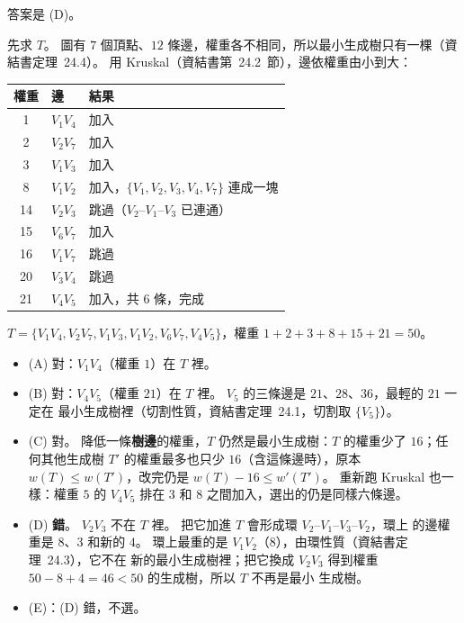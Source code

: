 \begin{pastsoln}
答案是 (D)。

先求 $T$。 圖有 $7$ 個頂點、$12$ 條邊，權重各不相同，所以最小生成樹只有一棵（資結書定理~24.4）。 用
Kruskal（資結書第~24.2~節），邊依權重由小到大：
\begin{center}
\begin{tabular}{cll}
\toprule
權重 & 邊 & 結果 \\
\midrule
1 & $V_1V_4$ & 加入 \\
2 & $V_2V_7$ & 加入 \\
3 & $V_1V_3$ & 加入 \\
8 & $V_1V_2$ & 加入，$\{V_1, V_2, V_3, V_4, V_7\}$ 連成一塊 \\
14 & $V_2V_3$ & 跳過（$V_2$--$V_1$--$V_3$ 已連通） \\
15 & $V_6V_7$ & 加入 \\
16 & $V_1V_7$ & 跳過 \\
20 & $V_3V_4$ & 跳過 \\
21 & $V_4V_5$ & 加入，共 $6$ 條，完成 \\
\bottomrule
\end{tabular}
\end{center}
$T = \{V_1V_4, V_2V_7, V_1V_3, V_1V_2, V_6V_7, V_4V_5\}$，權重 $1 + 2 + 3 + 8 + 15 + 21 = 50$。
\begin{itemize}
\item (A) 對：$V_1V_4$（權重 $1$）在 $T$ 裡。
\item (B) 對：$V_4V_5$（權重 $21$）在 $T$ 裡。 $V_5$ 的三條邊是 $21$、$28$、$36$，最輕的 $21$ 一定在
最小生成樹裡（切割性質，資結書定理~24.1，切割取 $\{V_5\}$）。
\item (C) 對。 降低一條\textbf{樹邊}的權重，$T$ 仍然是最小生成樹：$T$ 的權重少了 $16$；任何其他生成樹
$T'$ 的權重最多也只少 $16$（含這條邊時），原本 $w(T) \le w(T')$，改完仍是 $w(T) - 16 \le w'(T')$。
重新跑 Kruskal 也一樣：權重 $5$ 的 $V_4V_5$ 排在 $3$ 和 $8$ 之間加入，選出的仍是同樣六條邊。
\item (D) \textbf{錯}。 $V_2V_3$ 不在 $T$ 裡。 把它加進 $T$ 會形成環 $V_2$--$V_1$--$V_3$--$V_2$，環上
的邊權重是 $8$、$3$ 和新的 $4$。 環上最重的是 $V_1V_2$（$8$），由環性質（資結書定理~24.3），它不在
新的最小生成樹裡；把它換成 $V_2V_3$ 得到權重 $50 - 8 + 4 = 46 < 50$ 的生成樹，所以 $T$ 不再是最小
生成樹。
\item (E)：(D) 錯，不選。
\end{itemize}
\end{pastsoln}
